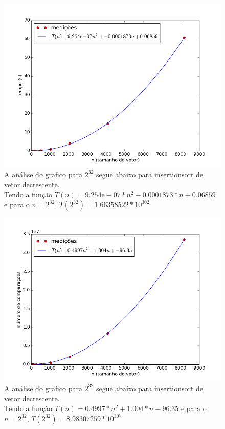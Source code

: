 \documentclass[12pt,a4paper,twoside]{report}
\begin{document}


\begin{figure}[ht]
\centering \includegraphics[scale=0.8]{../insertionsort/imagens/insertionsortDecrescente0.png}
\caption{A análise do grafico para $2^{32}$ segue abaixo para insertionsort de vetor decrescente.\\
Tendo a função $T(n) = 9.254\mathrm{e}-07*n^2-0.0001873*n+0.06859$ e para o $n =2^{32}$, $T(2^{32}) = 1.66358522 * 10^{302}$}
\end{figure}

\begin{figure}[ht]
\centering \includegraphics[scale=0.8]{../insertionsort/imagens/insertionsortDecrescente1.png}
\caption{A análise do grafico para $2^{32}$ segue abaixo para insertionsort de vetor decrescente.\\
Tendo a função $T(n) = 0.4997*n^2+1.004*n-96.35$ e para o $n =2^{32}$, $T(2^{32}) = 8.98307259 * 10^{307}$}
\label{fig:insertionsortDecrescente1}
\end{figure}
\end{document}
